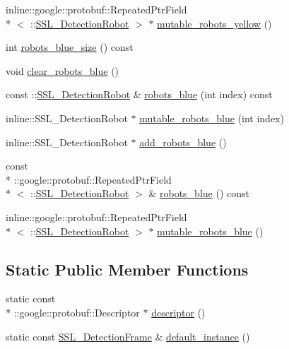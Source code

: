 \begin{DoxyCompactItemize}
\item 
inline\-::google\-::protobuf\-::\-Repeated\-Ptr\-Field\\*
$<$ \-::\hyperlink{class_s_s_l___detection_robot}{S\-S\-L\-\_\-\-Detection\-Robot} $>$ $\ast$ \hyperlink{class_s_s_l___detection_frame_a2d1f54b2ac8ce630de718a9d6fa8003c}{mutable\-\_\-robots\-\_\-yellow} ()
\item 
int \hyperlink{class_s_s_l___detection_frame_a4a25dbf89bc4f7880edc27fa0d9af723}{robots\-\_\-blue\-\_\-size} () const 
\item 
void \hyperlink{class_s_s_l___detection_frame_a35e5d200612abca84d2399ca7428a45e}{clear\-\_\-robots\-\_\-blue} ()
\item 
const \-::\hyperlink{class_s_s_l___detection_robot}{S\-S\-L\-\_\-\-Detection\-Robot} \& \hyperlink{class_s_s_l___detection_frame_af2341b67a3de5f29425e9dbc6bf3b033}{robots\-\_\-blue} (int index) const 
\item 
inline\-::\-S\-S\-L\-\_\-\-Detection\-Robot $\ast$ \hyperlink{class_s_s_l___detection_frame_aa1fc324dd204d3f33ae72b07dc7871a7}{mutable\-\_\-robots\-\_\-blue} (int index)
\item 
inline\-::\-S\-S\-L\-\_\-\-Detection\-Robot $\ast$ \hyperlink{class_s_s_l___detection_frame_af3a54e0ec33212ddc097855d90f11f76}{add\-\_\-robots\-\_\-blue} ()
\item 
const \\*
\-::google\-::protobuf\-::\-Repeated\-Ptr\-Field\\*
$<$ \-::\hyperlink{class_s_s_l___detection_robot}{S\-S\-L\-\_\-\-Detection\-Robot} $>$ \& \hyperlink{class_s_s_l___detection_frame_ab1a12bac14509f7608080c2ca1ea88e3}{robots\-\_\-blue} () const 
\item 
inline\-::google\-::protobuf\-::\-Repeated\-Ptr\-Field\\*
$<$ \-::\hyperlink{class_s_s_l___detection_robot}{S\-S\-L\-\_\-\-Detection\-Robot} $>$ $\ast$ \hyperlink{class_s_s_l___detection_frame_a9a44e0d94e99907bc2df04d7b401e5dc}{mutable\-\_\-robots\-\_\-blue} ()
\end{DoxyCompactItemize}
\subsection*{Static Public Member Functions}
\begin{DoxyCompactItemize}
\item 
static const \\*
\-::google\-::protobuf\-::\-Descriptor $\ast$ \hyperlink{class_s_s_l___detection_frame_a25642ec57295f6cec28d297d15dcfe4e}{descriptor} ()
\item 
static const \hyperlink{class_s_s_l___detection_frame}{S\-S\-L\-\_\-\-Detection\-Frame} \& \hyperlink{class_s_s_l___detection_frame_a135f62afdc3bd879d234995b91083c75}{default\-\_\-instance} ()
\end{DoxyCompactItemize}

